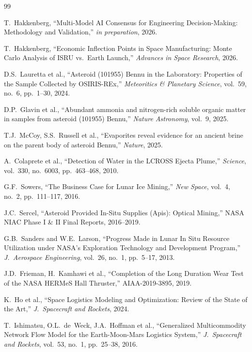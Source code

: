\documentclass[preprint,12pt]{elsarticle}
\begin{document}
\begin{thebibliography}{99}

T.\ Hakkenberg, ``Multi-Model AI Consensus for Engineering Decision-Making: Methodology and Validation,'' \textit{in preparation}, 2026.

T.\ Hakkenberg, ``Economic Inflection Points in Space Manufacturing: Monte Carlo Analysis of ISRU vs.\ Earth Launch,'' \textit{Advances in Space Research}, 2026.

D.S.\ Lauretta et al., ``Asteroid (101955) Bennu in the Laboratory: Properties of the Sample Collected by OSIRIS-REx,'' \textit{Meteoritics \& Planetary Science}, vol.~59, no.~6, pp.~1--30, 2024.

D.P.\ Glavin et al., ``Abundant ammonia and nitrogen-rich soluble organic matter in samples from asteroid (101955) Bennu,'' \textit{Nature Astronomy}, vol.~9, 2025.

T.J.\ McCoy, S.S.\ Russell et al., ``Evaporites reveal evidence for an ancient brine on the parent body of asteroid Bennu,'' \textit{Nature}, 2025.

A.\ Colaprete et al., ``Detection of Water in the LCROSS Ejecta Plume,'' \textit{Science}, vol.~330, no.~6003, pp.~463--468, 2010.

G.F.\ Sowers, ``The Business Case for Lunar Ice Mining,'' \textit{New Space}, vol.~4, no.~2, pp.~111--117, 2016.

J.C.\ Sercel, ``Asteroid Provided In-Situ Supplies (Apis): Optical Mining,'' NASA NIAC Phase I \& II Final Reports, 2016--2019.

G.B.\ Sanders and W.E.\ Larson, ``Progress Made in Lunar In Situ Resource Utilization under NASA's Exploration Technology and Development Program,'' \textit{J.\ Aerospace Engineering}, vol.~26, no.~1, pp.~5--17, 2013.

J.D.\ Frieman, H.\ Kamhawi et al., ``Completion of the Long Duration Wear Test of the NASA HERMeS Hall Thruster,'' AIAA-2019-3895, 2019.

K.\ Ho et al., ``Space Logistics Modeling and Optimization: Review of the State of the Art,'' \textit{J.\ Spacecraft and Rockets}, 2024.

T.\ Ishimatsu, O.L.\ de~Weck, J.A.\ Hoffman et al., ``Generalized Multicommodity Network Flow Model for the Earth-Moon-Mars Logistics System,'' \textit{J.\ Spacecraft and Rockets}, vol.~53, no.~1, pp.~25--38, 2016.

\end{thebibliography}
\end{document}

